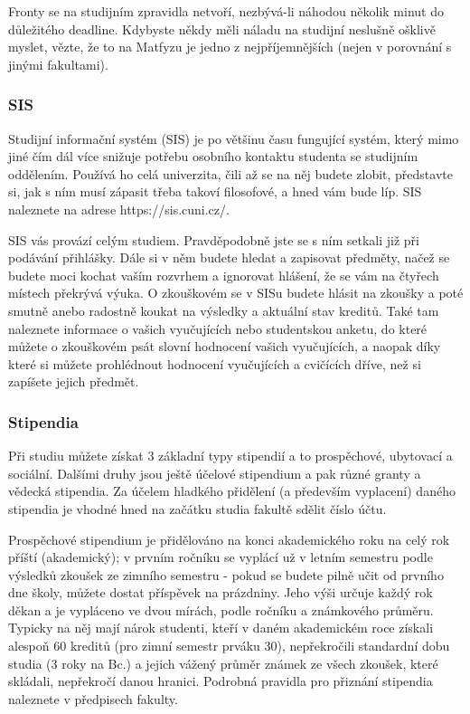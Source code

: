 Fronty se na studijním zpravidla netvoří, nezbývá-li náhodou několik minut do důležitého deadline. Kdybyste někdy měli náladu na studijní neslušně ošklivě myslet, vězte, že to na Matfyzu je jedno z nejpříjemnějších (nejen v porovnání s jinými fakultami).


\subsubsection{SIS}
Studijní informační systém (SIS) je po většinu času fungující systém, který mimo jiné čím dál více snižuje potřebu osobního kontaktu studenta se studijním oddělením. Používá ho celá univerzita, čili až se na něj budete zlobit, představte si, jak s ním musí zápasit třeba takoví filosofové, a hned vám bude líp. SIS naleznete na adrese https://sis.cuni.cz/.

SIS vás provází celým studiem. Pravděpodobně jste se s ním setkali již při podávání přihlášky. Dále si v něm budete hledat a zapisovat předměty, načež se budete moci kochat vaším rozvrhem a ignorovat hlášení, že se vám na čtyřech místech překrývá výuka. O zkouškovém se v SISu budete hlásit na zkoušky a poté smutně anebo radostně koukat na výsledky a aktuální stav kreditů. Také tam naleznete informace o vašich vyučujících nebo studentskou anketu, do které můžete o zkouškovém psát slovní hodnocení vašich vyučujících, a naopak díky které si můžete prohlédnout hodnocení vyučujících a cvičících dříve, než si zapíšete jejich předmět.

\subsubsection{Stipendia}
Při studiu můžete získat 3 základní typy stipendií a to prospěchové, ubytovací a sociální. Dalšími druhy jsou ještě účelové stipendium a pak různé granty a vědecká stipendia. Za účelem hladkého přidělení (a především vyplacení) daného stipendia je vhodné hned na začátku studia fakultě sdělit číslo účtu.

Prospěchové stipendium je přidělováno na konci akademického roku na celý rok příští (akademický); v prvním ročníku se vyplácí už v letním semestru podle výsledků zkoušek ze zimního semestru - pokud se budete pilně učit od prvního dne školy, můžete dostat příspěvek na prázdniny. Jeho výši určuje každý rok děkan a je vypláceno ve dvou mírách, podle ročníku a známkového průměru. Typicky na něj mají nárok studenti, kteří v daném akademickém roce získali alespoň 60 kreditů (pro zimní semestr prváku 30), nepřekročili standardní dobu studia (3 roky na Bc.) a jejich vážený průměr známek ze všech zkoušek, které skládali, nepřekročí danou hranici. Podrobná pravidla pro přiznání stipendia naleznete v předpisech fakulty.

